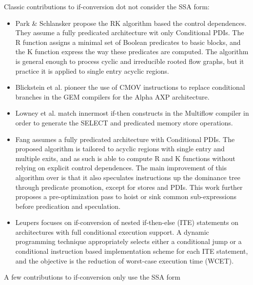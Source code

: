 Classic contributions to if-conversion
dot not consider the SSA form: \begin{itemize}


\item Park \& Schlansker \cite{Park:1991:TR58} propose the RK algorithm based
the control dependences. They assume a fully predicated architecture wit only
Conditional PDIs. The R function assigns a minimal set of Boolean predicates to
basic blocks, and the K function express the way these predicates are computed.
The algorithm is general enough to process cyclic and irreducible rooted flow
graphs, but it practice it is applied to single entry acyclic regions.

\item Blickstein et al. \cite{Blickstein:1992:DTJ} pioneer the use of CMOV
instructions to replace conditional branches in the GEM compilers for the Alpha
AXP architecture.

\item Lowney et al. \cite{Lowney:1993:JS} match innermost if-then constructs in
the Multiflow compiler in order to generate the SELECT and predicated
memory store operations.

\item Fang \cite{Fang:1996:LCPC} assumes a fully predicated architecture with
Conditional PDIs. The proposed algorithm is tailored to acyclic regions with
single entry and multiple exits, and as such is able to compute R and K
functions without relying on explicit control dependences.  The main improvement
of this algorithm over \cite{Park:1991:TR58} is that it also speculates
instructions up the dominance tree through predicate promotion, except for
stores and PDIs. This work further proposes a pre-optimization pass to hoist or
sink common sub-expressions before predication and speculation.

\item Leupers \cite{Leupers:1999:DATE} focuses on if-conversion of nested
if-then-else (ITE) statements on architectures with full conditional execution
support. A dynamic programming technique appropriately selects either a
conditional jump or a conditional instruction based implementation scheme for
each ITE statement, and the objective is the reduction of worst-case execution
time (WCET).

\end{itemize} A few contributions to if-conversion only use the SSA form

